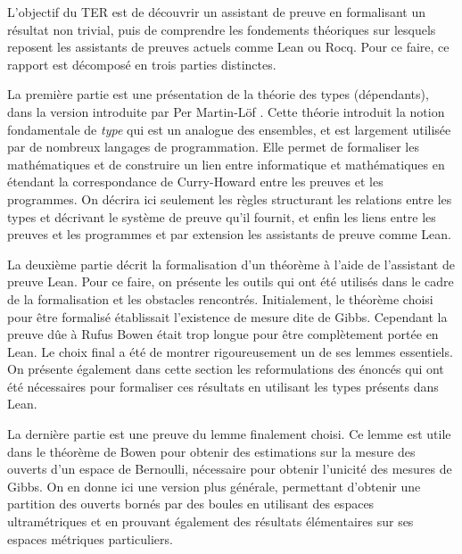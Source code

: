 \documentclass[../rapport.tex]{subfiles}
\begin{document}
  L'objectif du TER est de découvrir un assistant de preuve en formalisant un résultat non trivial,
  puis de comprendre les fondements théoriques sur lesquels reposent les assistants de preuves actuels comme Lean ou Rocq.
  Pour ce faire, ce rapport est décomposé en trois parties distinctes.
  \vspace{0em}

  La première partie est une présentation de la théorie des types (dépendants),
  dans la version introduite par Per Martin-Löf \cite{martin2021intuitionistic}.
  Cette théorie introduit la notion fondamentale de \textit{type} qui est un analogue des ensembles,
  et est largement utilisée par de nombreux langages de programmation.
  Elle permet de formaliser les mathématiques et de construire un lien entre informatique et mathématiques en étendant
  la correspondance de Curry-Howard entre les preuves et les programmes.
  On décrira ici seulement les règles structurant les relations entre les types et décrivant le système de preuve qu'il fournit,
  et enfin les liens entre les preuves et les programmes et par extension les assistants de preuve comme Lean.
  \vspace{1em}

  La deuxième partie décrit la formalisation d'un théorème à l'aide de l'assistant de preuve Lean.
  Pour ce faire, on présente les outils qui ont été utilisés dans le cadre de la formalisation et les obstacles rencontrés.
  Initialement, le théorème choisi pour être formalisé établissait l'existence de mesure dite de Gibbs.
  Cependant la preuve dûe à Rufus Bowen \cite{bowen} était trop longue pour être complètement portée en Lean.
  Le choix final a été de montrer rigoureusement un de ses lemmes essentiels.
  On présente également dans cette section les reformulations des énoncés qui ont été nécessaires pour formaliser
  ces résultats en utilisant les types présents dans Lean.
  \vspace{1em}

  La dernière partie est une preuve du lemme finalement choisi.
  Ce lemme est utile dans le théorème de Bowen pour obtenir des estimations sur la mesure des ouverts d'un espace de Bernoulli,
  nécessaire pour obtenir l'unicité des mesures de Gibbs.
  On en donne ici une version plus générale,
  permettant d'obtenir une partition des ouverts bornés par des boules en utilisant des espaces ultramétriques
  et en prouvant également des résultats élémentaires sur ses espaces métriques particuliers.
\end{document}
